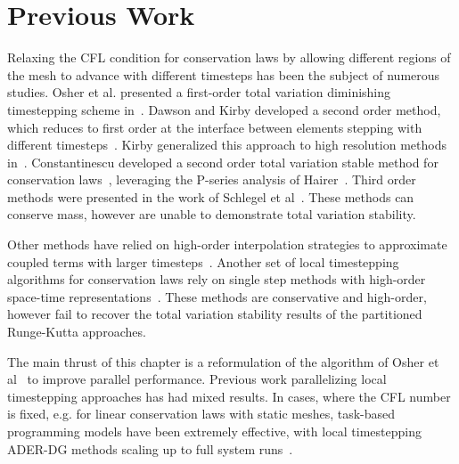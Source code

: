 \section{Previous Work}
\label{sec:prev}

Relaxing the CFL condition for conservation laws by allowing different regions of the mesh to advance with different timesteps has been the subject of numerous studies. Osher et al. presented a first-order total variation diminishing timestepping scheme in~\cite{Osher1983}. Dawson and Kirby developed a second order method, which reduces to first order at the interface between elements stepping with different timesteps~\cite{Dawson2000}. Kirby generalized this approach to high resolution methods in~\cite{Kirby2003}. Constantinescu developed a second order total variation stable method for conservation laws~\cite{Constantinescu2007}, leveraging the P-series analysis of Hairer~\cite{Hairer1981}. Third order methods were presented in the work of Schlegel et al~\cite{Schlegel2009}. These methods can conserve mass, however are unable to demonstrate total variation stability.

Other methods have relied on high-order interpolation strategies to approximate coupled terms with larger timesteps~\cite{Krivodonova2010, Gupta2016, Hoang2019}. Another set of local timestepping algorithms for conservation laws rely on single step methods with high-order space-time representations~\cite{Loercher2007,Dumbser2007,Taube2009}. These methods are conservative and high-order, however fail to recover the total variation stability results of the partitioned Runge-Kutta approaches.

The main thrust of this chapter is a reformulation of the algorithm of Osher et al~\cite{Osher1983} to improve parallel performance. Previous work parallelizing local timestepping approaches has had mixed results. In cases, where the CFL number is fixed, e.g. for linear conservation laws with static meshes, task-based programming models have been extremely effective, with local timestepping ADER-DG methods scaling up to full system runs~\cite{Breuer2016,Uphoff2017}. 

